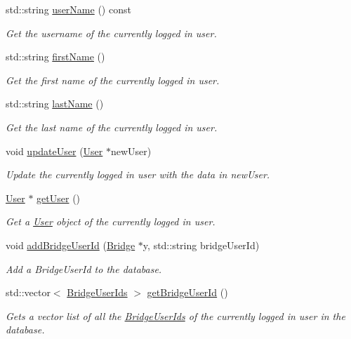 \begin{DoxyCompactItemize}
\item 
std\+::string \hyperlink{classSession_a4e3ae70e1af1b975bb0cb11c48f8d0a0}{user\+Name} () const 
\begin{DoxyCompactList}\small\item\em Get the username of the currently logged in user. \end{DoxyCompactList}\item 
std\+::string \hyperlink{classSession_a353b32ca0ddd116b436b900cb0c798b6}{first\+Name} ()
\begin{DoxyCompactList}\small\item\em Get the first name of the currently logged in user. \end{DoxyCompactList}\item 
std\+::string \hyperlink{classSession_ad4845846398dee6ae4cdffdd0870ccb5}{last\+Name} ()
\begin{DoxyCompactList}\small\item\em Get the last name of the currently logged in user. \end{DoxyCompactList}\item 
void \hyperlink{classSession_a646f3f09d40303c6539c7bbacb93893e}{update\+User} (\hyperlink{classUser}{User} $\ast$new\+User)
\begin{DoxyCompactList}\small\item\em Update the currently logged in user with the data in new\+User. \end{DoxyCompactList}\item 
\hyperlink{classUser}{User} $\ast$ \hyperlink{classSession_aa01be017bbea5350214c2ddff5512073}{get\+User} ()
\begin{DoxyCompactList}\small\item\em Get a \hyperlink{classUser}{User} object of the currently logged in user. \end{DoxyCompactList}\item 
void \hyperlink{classSession_aeaa52fe80f71a9c299a7fe10a1568568}{add\+Bridge\+User\+Id} (\hyperlink{classBridge}{Bridge} $\ast$y, std\+::string bridge\+User\+Id)
\begin{DoxyCompactList}\small\item\em Add a Bridge\+User\+Id to the database. \end{DoxyCompactList}\item 
std\+::vector$<$ \hyperlink{classBridgeUserIds}{Bridge\+User\+Ids} $>$ \hyperlink{classSession_a6f9e5ceea5b79487e7c9fdbd9f7b2491}{get\+Bridge\+User\+Id} ()
\begin{DoxyCompactList}\small\item\em Gets a vector list of all the \hyperlink{classBridgeUserIds}{Bridge\+User\+Ids} of the currently logged in user in the database. \end{DoxyCompactList}\item 

\end{DoxyCompactItemize}
